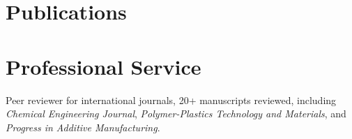 \documentclass[12pt]{article}
\begin{document}
\section{Publications}


\section{Professional Service}
Peer reviewer for international journals, 20+ manuscripts reviewed, including \emph{Chemical Engineering Journal}, \emph{Polymer-Plastics Technology and Materials}, and \emph{Progress in Additive Manufacturing}.
\end{document}

